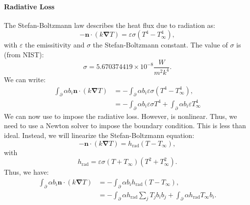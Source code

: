 \documentclass[letterpaper]{article}
\newcommand\bn{\boldsymbol{\nabla}}
\renewcommand{\(}{\left(}
\renewcommand{\)}{\right)}
\renewcommand{\[}{\left[}
\renewcommand{\]}{\right]}
\begin{document}
\paragraph{Radiative Loss}
The Stefan-Boltzmann law describes the heat flux due to radiation as:
\begin{equation}
  -\boldsymbol{n} \cdot  \(k \bn T\) = \varepsilon \sigma \(T^4 -T_{\infty}^4\),
\end{equation}
with $\varepsilon$ the emissitivity and $\sigma$ the Stefan-Boltzmann constant.
The value of $\sigma$ is (from NIST):
\begin{equation}
  \sigma = 5.670374419 \times 10^{-8} \frac{W}{m^2 k^4}.
\end{equation}
We can write:
\begin{equation}
  \begin{split}
    \int_{\partial} \alpha b_i \boldsymbol{n} \cdot \(k\bn T\) &= 
    -\int_{\partial} \alpha b_i \varepsilon \sigma \(T^4 - T_{\infty}^4\),\\
    &= -\int_{\partial} \alpha b_i \varepsilon \sigma T^4 + 
    \int_{\partial} \alpha b_i \varepsilon T_{\infty}^4
  \end{split}
  \label{radiation}
\end{equation}
We can now use  to impose the radiative loss. However,
 is nonlinear. Thus, we need to use a Newton solver to impose
the boundary condition. This is less than ideal. Instead, we will linearize the
Stefan-Boltzmann equation:
\begin{equation}
  -\boldsymbol{n} \cdot \(k\bn T\) = h_{\text{rad}}\(T-T_{\infty}\),
\end{equation}
with
\begin{equation}
  h_{\text{rad}} = \varepsilon \sigma\(T+T_{\infty}\)\(T^2 + T_{\infty}^2\).
\end{equation}
Thus, we have:
\begin{equation}
  \begin{split}
    \int_{\partial} \alpha b_i \boldsymbol{n} \cdot \(k \bn T\) &= 
    -\int_{\partial} \alpha b_i h_{\text{rad}} \(T-T_{\infty}\),\\
    &=-\int_{\partial} \alpha h_{\text{rad}} \sum_j T_j b_i b_j +
    \int_{\partial} \alpha h_{\text{rad}} T_{\infty} b_i.
  \end{split}
\end{equation}
\end{document}
